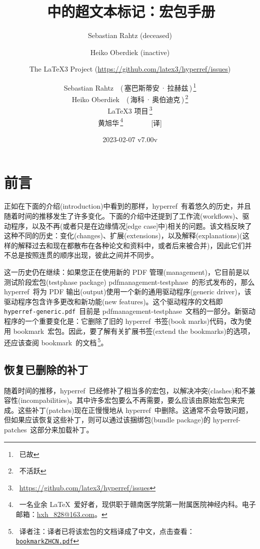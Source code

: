 \documentclass{article}
\author{Sebastian Rahtz (deceased)\and
       Heiko Oberdiek (inactive)\and
       The \LaTeX3 Project (\url{https://github.com/latex3/hyperref/issues})}
\author{Sebastian Rahtz~~(\,塞巴斯蒂安\,·\,拉赫兹\,)\,\thanks{\ 已故} \\[4pt]
       Heiko Oberdiek~~(\,海科\,·\,奥伯迪克\,)\,\thanks{\ 不活跃} \\[4pt]
       \LaTeX3 项目\,\thanks{\ \url{https://github.com/latex3/hyperref/issues}}\\[2.0em]
       黄旭华\,\thanks{\ 一名业余 \LaTeX\ 爱好者，现供职于赣南医学院第一附属医院神经内科。电子邮箱：\href{mailto:hxh\_828@163.com}{hxh\_828@163.com}。}\ \ \ \ \ \ \ \ [译]\vspace{2.0em}}
\title{{\huge \hologo{LaTeX}\,{\huge \Heiti 中的超文本标记}：{\Huge \xpackage{hyperref}}{\huge \Heiti 宏包手册}}\vspace{2.0em}}
\date{2023-02-07 v7.00v}
\newcommand*{\xpackage}[1]{\textsf{#1}}
\newcommand{\heiti}{\CJKfamily{heiti}} %
\begin{document}
\pagestyle{plain} %
\maketitle
\thispagestyle{empty} %
\newpage
\tableofcontents
\setcounter{tocdepth}{2}%

\section{\heiti 前言}
正如在下面的介绍(introduction)中看到的那样，\xpackage{hyperref}\ 有着悠久的历史，并且随着时间的推移发生了许多变化。下面的介绍中还提到了工作流(workflows)、驱动程序，以及不再(或者只是在边缘情况[edge case]中)相关的问题。该文档反映了这种不同的历史：变化(changes)、扩展(extensions)，以及解释(explanations)(这样的解释过去和现在都散布在各种论文和资料中，或者后来被合并)，因此它们并不总是按照连贯的顺序出现，彼此之间并不同步。

这一历史仍在继续：如果您正在使用新的  PDF 管理(management)，它目前是以测试阶段宏包(testphase package) \xpackage{pdfmanagement-testphase}\ 的形式发布的，那么 \xpackage{hyperref}\ 将为 PDF 输出(output)使用一个新的通用驱动程序(generic driver)，该驱动程序包含许多更改和新功能(new features)。这个驱动程序的文档即 \texttt{hyperref-generic.pdf}\ 目前是 \xpackage{pdfmanagement-testphase}\ 文档的一部分。新驱动程序的一个重要变化是：它删除了旧的 \xpackage{hyperref}\ 书签(book marks)代码，改为使用 \xpackage{bookmark}\ 宏包。因此，要了解有关扩展书签(extend the bookmarks)的选项，还应该查阅 \xpackage{bookmark}\ 的文档\,\footnote{\ 译者注：译者已将该宏包的文档译成了中文，点击查看：\href{run:bookmark_ZH_CN.pdf}{\texttt{bookmark\raisebox{-0.7mm}{\,-\,}ZH\raisebox{-0.7mm}{\,-}CN.pdf}}}。

\subsection[恢复已删除的补丁]{\heiti 恢复已删除的补丁}


随着时间的推移，\xpackage{hyperref}\ 已经修补了相当多的宏包，以解决冲突(clashes)和不兼容性(incompabilities)。其中许多宏包要么不再需要，要么应该由原始宏包来完成。这些补丁(patches)现在正慢慢地从 \xpackage{hyperref}\ 中删除。这通常不会导致问题，但如果应该恢复这些补丁，则可以通过该捆绑包(bundle package)的 \xpackage{hyperref-patches}\ 这部分来加载补丁。


\newpage
\end{document}
